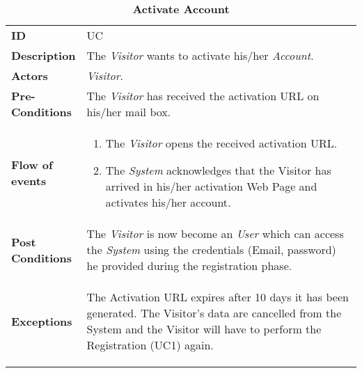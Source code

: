 \begin{longtable}{|p{0.2\linewidth} p{0.8\linewidth}|}
	\captionsetup{labelformat=empty} %
	\caption{\textbf{Activate Account}} %
	\label{UC_Activate}	\\ \hline
	
	\textbf{ID} & UC\theUseCaseIdCounter \\ \hline
	\textbf{Description} & The \emph{Visitor} wants to activate his/her \emph{Account}. \\ \hline
	\textbf{Actors} & \emph{Visitor}.\\ \hline
	\textbf{Pre-Conditions} & The \emph{Visitor} has received the activation URL on his/her mail box. \\ \hline
	\textbf{Flow of events} & 
	\begin{enumerate}
		\item The \emph{Visitor} opens the received activation URL.
		\item The \emph{System} acknowledges that the Visitor has arrived in his/her activation Web Page and activates his/her account.
	\end{enumerate}	 \\ \hline
	\textbf{Post Conditions} & The \emph{Visitor} is now become an \emph{User} which can access the \emph{System} using the credentials (Email, password) he provided during the registration phase. \\ \hline
	\textbf{Exceptions} & 
	\begin{itemize}
		The Activation URL expires after 10 days it has been generated. The Visitor's data are cancelled from the System and the Visitor will have to perform the Registration (UC1) again.
	\end{itemize} \\ \hline
\end{longtable}


